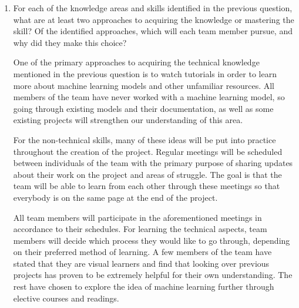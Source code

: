 \documentclass[12pt]{article}
\begin{document}
\begin{enumerate}
  \item For each of the knowledge areas and skills identified in the previous
  question, what are at least two approaches to acquiring the knowledge or
  mastering the skill?  Of the identified approaches, which will each team
  member pursue, and why did they make this choice?

One of the primary approaches to acquiring the technical knowledge mentioned in
the previous question is to watch tutorials in order to learn more about machine
learning models and other unfamiliar resources. All members of the team have
never worked with a machine learning model, so going through existing models and
their documentation, as well as some existing projects will strengthen our
understanding of this area. 

For the non-technical skills, many of these ideas will be put into practice
throughout the creation of the project. Regular meetings will be scheduled
between individuals of the team with the primary purpose of sharing updates
about their work on the project and areas of struggle. The goal is that the team
will be able to learn from each other through these meetings so that everybody
is on the same page at the end of the project.

All team members will participate in the aforementioned meetings in accordance
to their schedules. For learning the technical aspects, team members will decide
which process they would like to go through, depending on their preferred method
of learning. A few members of the team have stated that they are visual learners
and find that looking over previous projects has proven to be extremely helpful
for their own understanding. The rest have chosen to explore the idea of machine
learning further through elective courses and readings.

\end{enumerate}
\end{document}
